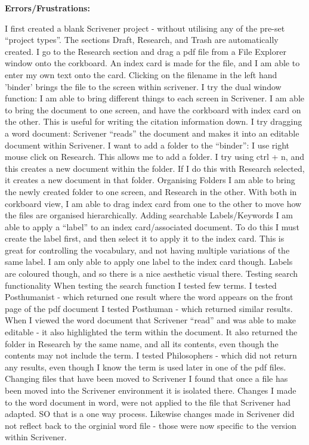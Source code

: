 \documentclass{article}
\begin{document}
\label{Error: Scrivener Errors/Frustrations}
\textbf{Errors/Frustrations:}

\begin{outline}
\1 I first created a blank Scrivener project - without utilising any of the pre-set ``project types''. 
    \2 The sections Draft, Research, and Trash are automatically created. 
\1 I go to the Research section and drag a pdf file from a File Explorer window onto the corkboard.
    \2 An index card is made for the file, and I am able to enter my own text onto the card. Clicking on the filename in the left hand 'binder' brings the file to the screen within scrivener. 
\1 I try the dual window function:
    \2 I am able to bring different things to each screen in Scrivener. I am able to bring the document to one screen, and have the corkboard with index card on the other. This is useful for writing the citation information down. 
\1 I try dragging a word document:
    \2 Scrivener ``reads'' the document and makes it into an editable document within Scrivener. 
\1 I want to add a folder to the ``binder'':
    \2 I use right mouse click on Research. This allows me to add a folder. I try using ctrl + n, and this creates a new document within the folder. If I do this with Research selected, it creates a new document in that folder. 
\1 Organising Folders
    \2 I am able to bring the newly created folder to one screen, and Research in the other. With both in corkboard view, I am able to drag index card from one to the other to move how the files are organised hierarchically.
\1 Adding searchable Labels/Keywords
    \2 I am able to apply a ``label'' to an index card/associated document. To do this I must create the label first, and then select it to apply it to the index card. This is great for controlling the vocabulary, and not having multiple variations of the same label. I am only able to apply one label to the index card though. Labels are coloured though, and so there is a nice aesthetic visual there. 
\1 Testing search functionality
    \2 When testing the search function I tested few terms. 
    \2 I tested Posthumanist - which returned one result where the word appears on the front page of the pdf document
    \2 I tested Posthuman - which returned similar results. When I viewed the word document that Scrivener ``read'' and was able to make editable - it also highlighted the term within the document. It also returned the folder in Research by the same name, and all its contents, even though the contents may not include the term.
    \2 I tested Philosophers - which did not return any results, even though I know the term is used later in one of the pdf files.
\1 Changing files that have been moved to Scrivener
    \2 I found that once a file has been moved into the Scrivener environment it is isolated there. Changes I made to the word document in word, were not applied to the file that Scrivener had adapted. SO that is a one way process. Likewise changes made in Scrivener did not reflect back to the orginial word file - those were now specific to the version within Scrivener.
\end{outline}
\end{document}
